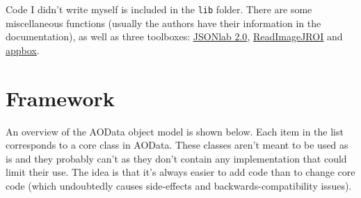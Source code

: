 \documentclass[10pt]{exam}
\newcommand\myurl[1]{\textcolor{blue}{\underline{#1}}}
\begin{document}
		Code I didn't write myself is included in the \texttt{lib} folder. There are some miscellaneous functions (usually the authors have their information in the documentation), as well as three toolboxes: \myurl{\href{https://www.mathworks.com/matlabcentral/fileexchange/33381-jsonlab-a-toolbox-to-encode-decode-json-files?s_tid=ta_fx_results}{JSONlab 2.0}}, \myurl{\href{https://github.com/DylanMuir/ReadImageJROI}{ReadImageJROI}} and \myurl{\href{https://github.com/cafarm/appbox}{appbox}}. 
	 

\section{Framework}\label{section:Framework}
	\noindent An overview of the AOData object model is shown below. Each item in the list corresponds to a core class in AOData. These classes aren't meant to be used as is and they probably can't as they don't contain any implementation that could limit their use. The idea is that it's always easier to add code than to change core code (which undoubtedly causes side-effects and backwards-compatibility issues). 
	
\end{document}
